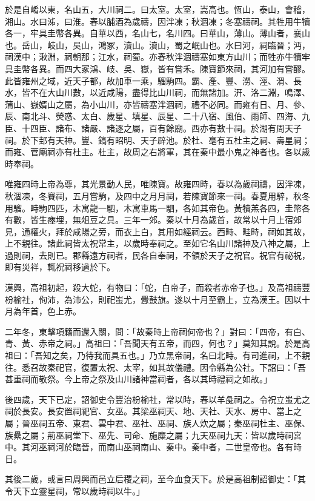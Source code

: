\begin{pinyinscope}
於是自崤以東，名山五，大川祠二。曰太室。太室，嵩高也。恆山，泰山，會稽，湘山。水曰泲，曰淮。春以脯酒為歲禱，因泮凍；秋涸凍；冬塞禱祠。其牲用牛犢各一，牢具圭幣各異。自華以西，名山七，名川四。曰華山，薄山。薄山者，襄山也。岳山，岐山，吳山，鴻冢，瀆山。瀆山，蜀之岷山也。水曰河，祠臨晉；沔，祠漢中；湫淵，祠朝那；江水，祠蜀。亦春秋泮涸禱塞如東方山川；而牲亦牛犢牢具圭幣各異。而四大冢鴻、岐、吳、嶽，皆有嘗禾。陳寶節來祠，其河加有嘗醪。此皆雍州之域，近天子都，故加車一乘，騮駒四。霸、產、豐、澇、涇、渭、長水，皆不在大山川數，以近咸陽，盡得比山川祠，而無諸加。汧、洛二淵，鳴澤、蒲山、嶽婿山之屬，為小山川，亦皆禱塞泮涸祠，禮不必同。而雍有日、月、參、辰、南北斗、熒惑、太白、歲星、填星、辰星、二十八宿、風伯、雨師、四海、九臣、十四臣、諸布、諸嚴、諸逐之屬，百有餘廟。西亦有數十祠。於湖有周天子祠。於下邽有天神。豐、鎬有昭明、天子辟池。於杜、亳有五杜主之祠、壽星祠；而雍、菅廟祠亦有杜主。杜主，故周之右將軍，其在秦中最小鬼之神者也。各以歲時奉祠。

唯雍四時上帝為尊，其光景動人民，唯陳寶。故雍四畤，春以為歲祠禱，因泮凍，秋涸凍，冬賽祠，五月嘗駒，及四中之月月祠，若陳寶節來一祠。春夏用騂，秋冬用騮。畤駒四匹，木寓龍一駟，木寓車馬一駟，各如其帝色。黃犢羔各四，圭幣各有數，皆生瘞埋，無俎豆之具。三年一郊。秦以十月為歲首，故常以十月上宿郊見，通權火，拜於咸陽之旁，而衣上白，其用如經祠云。西畤、畦畤，祠如其故，上不親往。諸此祠皆太祝常主，以歲時奉祠之。至如它名山川諸神及八神之屬，上過則祠，去則已。郡縣遠方祠者，民各自奉祠，不領於天子之祝官。祝官有祕祝，即有災祥，輒祝祠移過於下。

漢興，高祖初起，殺大蛇，有物曰：「蛇，白帝子，而殺者赤帝子也。」及高祖禱豐枌榆社，侚沛，為沛公，則祀蚩尤，釁鼓旗。遂以十月至霸上，立為漢王。因以十月為年首，色上赤。

二年冬，東擊項籍而還入關，問：「故秦時上帝祠何帝也？」對曰：「四帝，有白、青、黃、赤帝之祠。」高祖曰：「吾聞天有五帝，而四，何也？」莫知其說。於是高祖曰：「吾知之矣，乃待我而具五也。」乃立黑帝祠，名曰北畤。有司進祠，上不親往。悉召故秦祀官，復置太祝、太宰，如其故儀禮。因令縣為公社。下詔曰：「吾甚重祠而敬祭。今上帝之祭及山川諸神當祠者，各以其時禮祠之如故。」

後四歲，天下已定，詔御史令豐治枌榆社，常以時，春以羊彘祠之。令祝立蚩尤之祠於長安。長安置祠祀官、女巫。其梁巫祠天、地、天社、天水、房中、當上之屬；晉巫祠五帝、東君、雲中君、巫社、巫祠、族人炊之屬；秦巫祠杜主、巫保、族纍之屬；荊巫祠堂下、巫先、司命、施糜之屬；九天巫祠九天：皆以歲時祠宮中。其河巫祠河於臨晉，而南山巫祠南山、秦中。秦中者，二世皇帝也。各有時日。

其後二歲，或言曰周興而邑立后稷之祠，至今血食天下。於是高祖制詔御史：「其令天下立靈星祠，常以歲時祠以牛。」


\end{pinyinscope}
